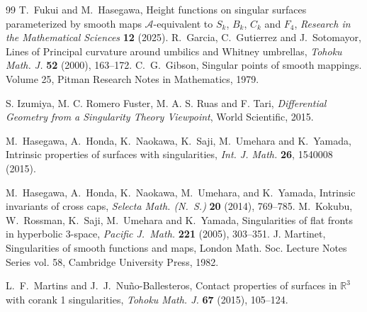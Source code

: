 \documentclass[12pt]{amsart}
\theoremstyle{plain}
\theoremstyle{definition}
\newcommand{\R}{\mathbb{R}}
\begin{document}
\begin{thebibliography}{99}
{\sc T.~Fukui} and {\sc M.~Hasegawa},
Height functions on singular surfaces parameterized by smooth maps $\mathcal{A}$-equivalent to $S_k$, $B_k$, $C_k$ and $F_4$, 
\textit{Research in the Mathematical Sciences} \textbf{12} (2025). 
{\sc R.~Garcia, C.~Gutierrez} and {\sc J.~Sotomayor},
Lines of Principal curvature around umbilics and Whitney umbrellas,
{\it Tohoku Math. J.} {\bf 52} (2000), 163--172.
C.~G.~Gibson,
Singular points of smooth mappings.
Volume 25, Pitman Research Notes in Mathematics, 1979. 

{\sc S. Izumiya, M. C. Romero Fuster, M. A. S. Ruas} and {\sc F. Tari},
\textit{Differential Geometry from a Singularity Theory Viewpoint},
World Scientific, 2015.

{\sc M.~Hasegawa, A.~Honda, K.~Naokawa, K.~Saji, M.~Umehara} and {\sc K.~Yamada},
Intrinsic properties of surfaces with singularities,
\textit{Int. J. Math.} \textbf{26}, 1540008 (2015). 

{\sc M.~Hasegawa, A.~Honda, K.~Naokawa, M.~Umehara}, and {\sc K.~Yamada},
Intrinsic invariants of cross caps, 
{\it Selecta Math. (N.~S.)} {\bf 20} (2014), 769--785.
{\sc M.~Kokubu, W.~Rossman, K.~Saji, M.~Umehara} and {\sc K.~Yamada},
Singularities of flat fronts in hyperbolic 3-space, 
{\it Pacific J.\ Math.} {\bf 221} (2005), 303--351.
{\sc J. Martinet},
Singularities of smooth functions and maps,
London Math. Soc. Lecture Notes Series vol. 58, Cambridge University Press, 1982.

{\sc L.~F.~Martins} and {\sc J.~J.~Nu\~no-Ballesteros}, 
Contact properties of surfaces in $\R^3$ with corank 1 singularities,
\textit{Tohoku Math. J.} \textbf{67} (2015), 105--124.


\end{thebibliography}
\end{document}
